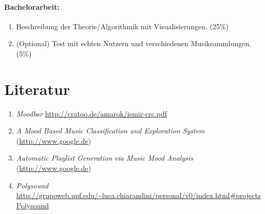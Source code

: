 \documentclass[8pt,a4paper,ngerman]{scrartcl}
\begin{document}
    \paragraph{Bachelorarbeit:}
        \begin{enumerate} 
            \item Beschreibung der Theorie/Algorithmik mit Visualisierungen. (25\%)
            \item (Optional) Test mit echten Nutzern und verschiedenen
                Musiksammlungen. (5\%)
        \end{enumerate}

\section{Literatur}
    \begin{enumerate}
        \item \textit{Moodbar} \url{http://cratoo.de/amarok/ismir-crc.pdf} \label{label_moodbar}
        \item \textit{A Mood Based Music Classification and Exploration System} (\url{http://www.google.de})
        \item \textit{Automatic Playlist Generation via Music Mood Analysis} (\url{http://www.google.de})
        \item \textit{Polysound} \url{http://grupoweb.upf.edu/~luca.chiarandini/personal/v0/index.html#projectsPolysound}
    \end{enumerate}


\newpage

\begin{figure}[p]
    \vspace*{-2.0cm}
\end{figure}
\end{document}
